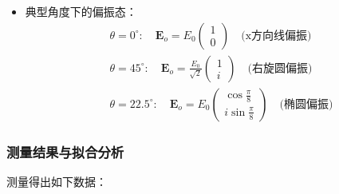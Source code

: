 \begin{itemize}

\item 典型角度下的偏振态：
\begin{align*}
&\theta=0^\circ: \quad \mathbf{E}_o = E_0\begin{pmatrix} 1 \\ 0 \end{pmatrix} \quad \text{(x方向线偏振)} \\
&\theta=45^\circ: \quad \mathbf{E}_o = \frac{E_0}{\sqrt{2}}\begin{pmatrix} 1 \\ i \end{pmatrix} \quad \text{(右旋圆偏振)} \\
&\theta=22.5^\circ: \quad \mathbf{E}_o = E_0\begin{pmatrix} \cos\frac{\pi}{8} \\ i\sin\frac{\pi}{8} \end{pmatrix} \quad \text{(椭圆偏振)}
\end{align*}
\end{itemize}
\subsubsection{测量结果与拟合分析}
测量得出如下数据：

